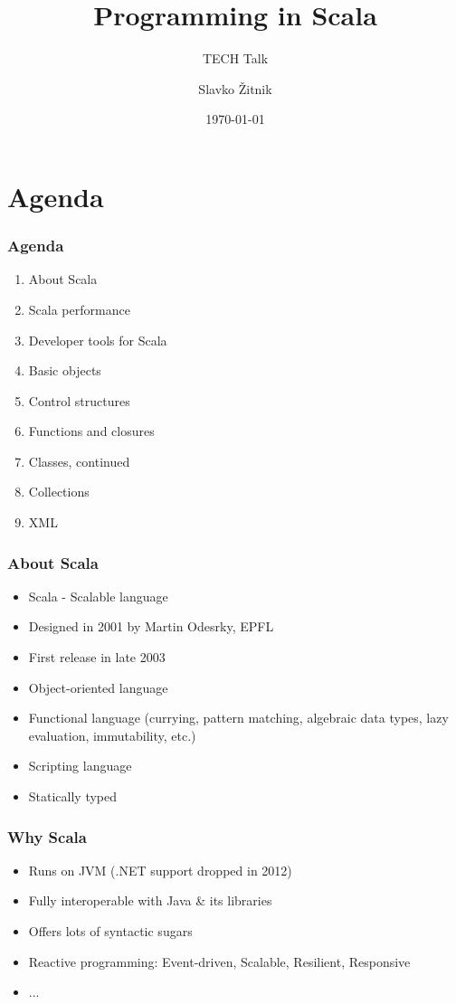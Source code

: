 \documentclass{beamer}
\title[Programming in Scala] %
{Programming in Scala}
\subtitle{TECH Talk}
\author{Slavko Žitnik\inst{1,2}}
\institute[Optilab d.o.o \& UL FRI] %
{
  \inst{1}%
  Optilab d.o.o.\\
  Dunajska cesta 152\\
  SI-1000 Ljubljana
  \and
  \inst{2}%
  University of Ljubljana\\
  Faculty of computer and information science\\
  Tržaška cesta 25\\
  SI-1000 Ljubljana
}
\date{\today}
\begin{document}
\frame{\titlepage}

\section{Agenda}
\begin{frame}
	\frametitle{Agenda}
	\begin{enumerate}
		\item About Scala
		\item Scala performance
		\item Developer tools for Scala
		\item Basic objects
		\item Control structures
		\item Functions and closures
		\item Classes, continued
		\item Collections
		\item XML
	\end{enumerate}
\end{frame}

\begin{frame}
	\frametitle{About Scala}
	\begin{itemize}
		\item Scala - Scalable language
		\item Designed in 2001 by Martin Odesrky, EPFL
		\item First release in late 2003
	\end{itemize}
	\begin{itemize}
		\item Object-oriented language
		\item Functional language (currying, pattern matching, algebraic data types, lazy evaluation, immutability, etc.)
		\item Scripting language
		\item Statically typed
	\end{itemize}
\end{frame}

\begin{frame}
	\frametitle{Why Scala}
	\begin{itemize}
		\item Runs on JVM (.NET support dropped in 2012)
		\item Fully interoperable with Java \& its libraries
		\item Offers lots of syntactic sugars
		\item Reactive programming: Event-driven, Scalable, Resilient, Responsive
		\item ...
	\end{itemize}
\end{frame}
\end{document}
